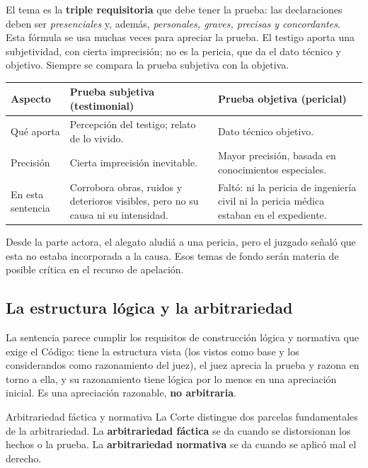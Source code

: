 \documentclass[12pt,oneside]{book}
\begin{document}
El tema es la \textbf{triple requisitoria} que debe tener la prueba: las declaraciones deben ser \emph{presenciales} y, adem\'as, \emph{personales, graves, precisas y concordantes}. Esta f\'ormula se usa muchas veces para apreciar la prueba. El testigo aporta una subjetividad, con cierta imprecisi\'on; no es la pericia, que da el dato t\'ecnico y objetivo. Siempre se compara la prueba subjetiva con la objetiva.

\begin{center}
\small
\begin{tabularx}{\textwidth}{@{}p{2.6cm}XX@{}}
\toprule
\textbf{Aspecto} & \textbf{Prueba subjetiva (testimonial)} & \textbf{Prueba objetiva (pericial)} \\
\midrule
Qu\'e aporta & Percepci\'on del testigo; relato de lo vivido. & Dato t\'ecnico objetivo. \\
\addlinespace
Precisi\'on & Cierta imprecisi\'on inevitable. & Mayor precisi\'on, basada en conocimientos especiales. \\
\addlinespace
En esta sentencia & Corrobora obras, ruidos y deterioros visibles, pero no su causa ni su intensidad. & Falt\'o: ni la pericia de ingenier\'ia civil ni la pericia m\'edica estaban en el expediente. \\
\bottomrule
\end{tabularx}
\end{center}

Desde la parte actora, el alegato aludi\'a a una pericia, pero el juzgado se\~nal\'o que esta no estaba incorporada a la causa. Esos temas de fondo ser\'an materia de posible cr\'itica en el recurso de apelaci\'on.

\subsection{La estructura l\'ogica y la arbitrariedad}

La sentencia parece cumplir los requisitos de construcci\'on l\'ogica y normativa que exige el C\'odigo: tiene la estructura vista (los vistos como base y los considerandos como razonamiento del juez), el juez aprecia la prueba y razona en torno a ella, y su razonamiento tiene l\'ogica por lo menos en una apreciaci\'on inicial. Es una apreciaci\'on razonable, \textbf{no arbitraria}.

\begin{definition}{Arbitrariedad f\'actica y normativa}
La Corte distingue dos parcelas fundamentales de la arbitrariedad. La \textbf{arbitrariedad f\'actica} se da cuando se distorsionan los hechos o la prueba. La \textbf{arbitrariedad normativa} se da cuando se aplic\'o mal el derecho.
\end{definition}
\end{document}
